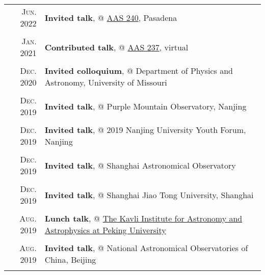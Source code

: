 \documentclass[letterpaper,10pt]{article}
\newcommand{\textwrap}{5.8in}       %
\begin{document}
\begin{longtable}{r|p{\textwrap}}
    \textsc{Jun. 2022}   &   \textbf{Invited talk}, @ \href{https://aas.org/meetings/aas240}{AAS 240}, Pasadena \\
    \multicolumn{2}{c}{} \\


    \textsc{Jan. 2021}   &   \textbf{Contributed talk}, @ \href{https://aas.org/meetings/aas237}{AAS 237}, virtual    \\
    \multicolumn{2}{c}{} \\

    \textsc{Dec. 2020}   &   \textbf{Invited colloquium}, @ Department of Physics and Astronomy, University of Missouri \\
    \multicolumn{2}{c}{} \\

    \textsc{Dec. 2019}   &   \textbf{Invited talk}, @ Purple Mountain Observatory, Nanjing \\
    \multicolumn{2}{c}{} \\

    \textsc{Dec. 2019}   &   \textbf{Invited talk}, @ 2019 Nanjing University Youth Forum, Nanjing \\
    \multicolumn{2}{c}{} \\

    \textsc{Dec. 2019}   &   \textbf{Invited talk}, @ Shanghai Astronomical Observatory \\
    \multicolumn{2}{c}{} \\

    \textsc{Dec. 2019}   &   \textbf{Invited talk}, @ Shanghai Jiao Tong University, Shanghai \\
    \multicolumn{2}{c}{} \\

    \textsc{Aug. 2019}   &   \textbf{Lunch talk}, @ \href{http://kiaa.pku.edu.cn/info/1025/5076.htm}{The Kavli Institute for 
    Astronomy and Astrophysics at Peking University} \\
    \multicolumn{2}{c}{} \\

    \textsc{Aug. 2019}   &   \textbf{Invited talk}, @ National Astronomical Observatories of China, Beijing \\
    \multicolumn{2}{c}{} \\


\end{longtable}
\end{document}
